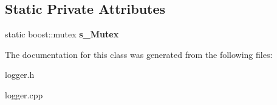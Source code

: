 \subsection*{Static Private Attributes}
\begin{DoxyCompactItemize}
\item 
\hypertarget{classengine_1_1cLogger_a5276c31bbf002c5a224095504bac62c5}{static boost\-::mutex {\bfseries s\-\_\-\-Mutex}}\label{classengine_1_1cLogger_a5276c31bbf002c5a224095504bac62c5}

\end{DoxyCompactItemize}


The documentation for this class was generated from the following files\-:\begin{DoxyCompactItemize}
\item 
logger.\-h\item 
logger.\-cpp\end{DoxyCompactItemize}
